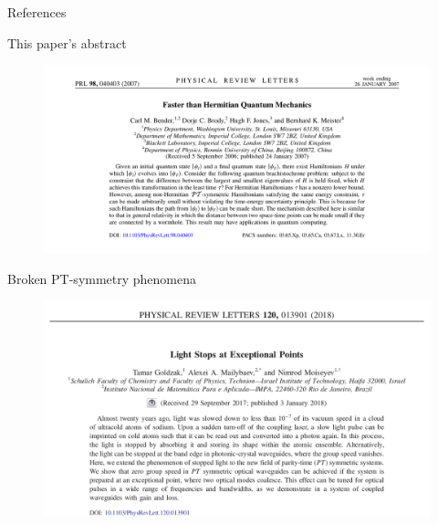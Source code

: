 \documentclass[10pt]{beamer}
\begin{document}
\begin{frame}{References} 
    \nocite{*}
    
    
\end{frame}

\pause

\begin{frame}{This paper's abstract}
\begin{figure}
    \hspace{-4.8em}
    \includegraphics[width=1.13\textwidth]{paper.png}
    \\
    \tiny{}
    \end{figure}
\end{frame}

\begin{frame}{Broken PT-symmetry phenomena}
\begin{figure}
    \hspace{-4.5em}
    \includegraphics[width=\textwidth]{lightstops.png}
    \\
    \tiny{}
    \end{figure}
\end{frame}
\end{document}
